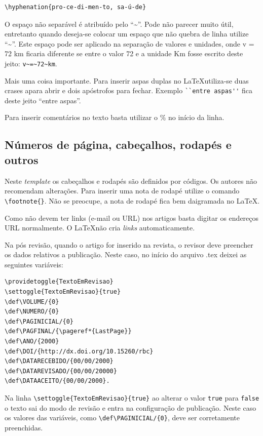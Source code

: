 \documentclass{RBClatex}
\def\VOLUME/{0}
\def\NUMERO/{0}
\def\PAGINICIAL/{0}
\def\PAGFINAL/{\pageref*{LastPage}}
\def\ANO/{2000}
\def\DOI/{http://dx.doi.org/10.15260/rbc.v0i0.00}
\def\DATARECEBIDO/{00/00/2000}
\def\DATAREVISADO/{00/00/20000}
\def\DATAACEITO/{00/00/2000}
\begin{document}
\begin{verbatim}
\hyphenation{pro-ce-di-men-to, sa-ú-de}
\end{verbatim}

O espaço não separável é atribuído pelo ``\textasciitilde{}''. Pode não parecer muito útil, entretanto quando deseja-se colocar um espaço que não quebra de linha utilize ``\textasciitilde{}''. Este espaço pode ser aplicado na separação de valores e unidades, onde v = 72 km ficaria diferente se entre o valor 72 e a unidade Km fosse escrito deste jeito:
\verb|v~=~72~km|.

Mais uma coisa importante. Para inserir aspas duplas no \LaTeX utiliza-se duas crases apara abrir e dois apóstrofos para fechar. Exemplo \verb|``entre aspas''| fica deste jeito ``entre aspas''.

Para inserir comentários no texto basta utilizar o $\%$ no início da linha.

\subsection{Números de página, cabeçalhos, rodapés e outros}

Neste \textit{template} os cabeçalhos e rodapés são definidos por códigos. Os autores não recomendam alterações. Para inserir uma nota de rodapé utilize o comando \verb|\footnote{}|. Não se preocupe, a nota de rodapé fica bem daigramada no \LaTeX.

Como não devem ter links (e-mail ou URL) nos artigos basta digitar os endereços URL normalmente. O \LaTeX não cria \textit{links} automaticamente.

Na pós revisão, quando o artigo for inserido na revista, o revisor deve preencher os dados relativos a publicação. Neste caso, no início do arquivo .tex deixei as seguintes variáveis:

\begin{lstlisting}
\providetoggle{TextoEmRevisao}  
\settoggle{TextoEmRevisao}{true} 
\def\VOLUME/{0}
\def\NUMERO/{0}
\def\PAGINICIAL/{0}
\def\PAGFINAL/{\pageref*{LastPage}}
\def\ANO/{2000}
\def\DOI/{http://dx.doi.org/10.15260/rbc}
\def\DATARECEBIDO/{00/00/2000}
\def\DATAREVISADO/{00/00/20000}
\def\DATAACEITO/{00/00/2000}.
\end{lstlisting}

Na linha \verb|\settoggle{TextoEmRevisao}{true}| ao alterar o valor \verb|true| para \verb|false| o texto sai do modo de revisão e entra na configuração de publicação. Neste caso os valores das variáveis, como \verb|\def\PAGINICIAL/{0}|, deve ser corretamente preenchidas.
\end{document}
